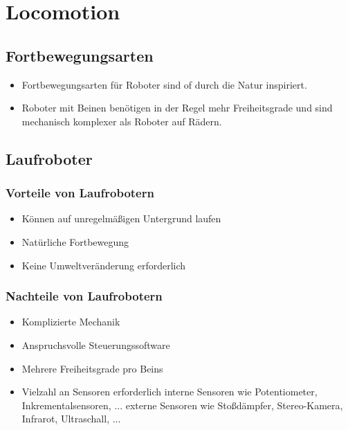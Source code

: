 \chapter{Locomotion}
\section{Fortbewegungsarten}
\begin{itemize}
	\item Fortbewegungsarten für Roboter sind of durch die Natur inspiriert.
	\item Roboter mit Beinen benötigen in der Regel mehr Freiheitsgrade und sind mechanisch komplexer als Roboter auf Rädern.
\end{itemize}
\section{Laufroboter}
\subsection{Vorteile von Laufrobotern}
\begin{itemize}
	\item Können auf unregelmäßigen Untergrund laufen
	\item Natürliche Fortbewegung
	\item Keine Umweltveränderung erforderlich
\end{itemize}
\subsection{Nachteile von Laufrobotern}
\begin{itemize}
	\item Komplizierte Mechanik
	\item Anspruchsvolle Steuerungssoftware
	\item Mehrere Freiheitsgrade pro Beins
	\item Vielzahl an Sensoren erforderlich
	\subitem interne Sensoren wie Potentiometer, Inkrementalsensoren, ...
	\subitem externe Sensoren wie Stoßdämpfer, Stereo-Kamera, Infrarot, Ultraschall, ...
\end{itemize}

